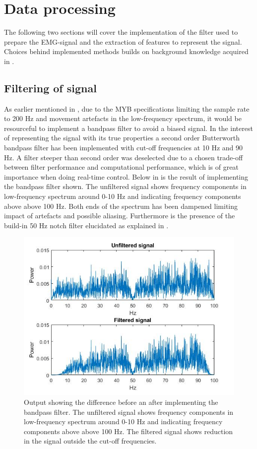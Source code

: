 

\section{Data processing}

The following two sections will cover the implementation of the filter used to prepare the EMG-signal and the extraction of features to represent the signal. Choices behind implemented methods builds on background knowledge acquired in .

\subsection{Filtering of signal} \label{sub:prePros} 

As earlier mentioned in , due to the MYB specifications limiting the sample rate to 200 Hz and movement artefacts in the low-frequency spectrum, it would be resourceful to implement a bandpass filter to avoid a biased signal.
In the interest of representing the signal with its true properties a second order Butterworth bandpass filter has been implemented with cut-off frequencies at 10 Hz and 90 Hz. A filter steeper than second order was deselected due to a chosen trade-off between filter performance and computational performance, which is of great importance when doing real-time control. Below in  is the result of implementing the bandpass filter shown. The unfiltered signal shows frequency components in low-frequency spectrum around 0-10 Hz and indicating frequency components above above 100 Hz. Both ends of the spectrum has been dampened limiting impact of artefacts and possible aliasing. Furthermore is the presence of the build-in 50 Hz notch filter elucidated as explained in .     


\begin{figure}[H]                 
\includegraphics[width=.8\textwidth]{figures/pMethods/Filt}  
\caption{Output showing the difference before an after implementing the bandpass filter. The unfiltered signal shows frequency components in low-frequency spectrum around 0-10 Hz and indicating frequency components above above 100 Hz. The filtered signal shows reduction in the signal outside the cut-off frequencies.}
\label{fig:filt} 
\end{figure}





